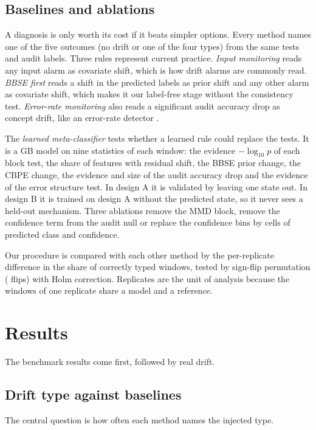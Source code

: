 \documentclass[10pt]{article}
\newcommand{\keep}[1]{\needspace{#1\baselineskip}}
\begin{document}
\subsection{Baselines and ablations}
\label{sec:baselines}
A diagnosis is only worth its cost if it beats simpler options. Every method names one of the five outcomes (no drift or one of the four types) from the same tests and audit labels. Three rules represent current practice. \emph{Input monitoring} reads any input alarm as covariate shift, which is how drift alarms are commonly read. \emph{BBSE first} reads a shift in the predicted labels as prior shift \cite{lipton2018bbse,rabanser2019failing} and any other alarm as covariate shift, which makes it our label-free stage without the consistency test. \emph{Error-rate monitoring} also reads a significant audit accuracy drop as concept drift, like an error-rate detector \cite{gama2004ddm}.

The \emph{learned meta-classifier} tests whether a learned rule could replace the tests. It is a GB model on nine statistics of each window: the evidence $-\log_{10}p$ of each block test, the share of features with residual shift, the BBSE prior change, the CBPE change, the evidence and size of the audit accuracy drop and the evidence of the error structure test. In design A it is validated by leaving one state out. In design B it is trained on design A without the predicted state, so it never sees a held-out mechanism. Three ablations remove the MMD block, remove the confidence term from the audit null or replace the confidence bins by cells of predicted class and confidence.

Our procedure is compared with each other method by the per-replicate difference in the share of correctly typed windows, tested by sign-flip permutation ( flips) with Holm correction. Replicates are the unit of analysis because the windows of one replicate share a model and a reference.

\section{Results}
\label{sec:results}

The benchmark results come first, followed by real drift.

\keep{6}\subsection{Drift type against baselines}
\label{sec:res-methods}
The central question is how often each method names the injected type.
\end{document}
